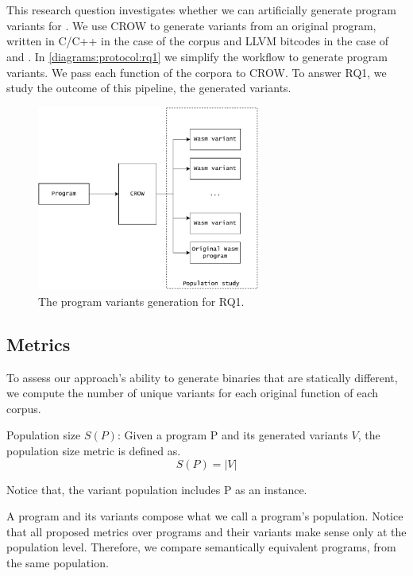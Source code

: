 
\section{\rqone}
\label{rq1:method}
This research question investigates whether we can artificially generate program variants for \wasm. We use CROW to generate variants from an original program, written in C/C++ in the case of the \corpusrosetta corpus and LLVM bitcodes in the case of \corpussodium and \corpusqrcode. 
In \autoref{diagrams:protocol:rq1} we simplify the workflow to generate \wasm program variants. We pass each function of the corpora to CROW. To answer RQ1, we study the outcome of this pipeline, the generated variants. 


\begin{figure}[h]
    \centering
    \includegraphics[height=2.4in]{diagrams/Rq1.pdf}
    \caption{The program variants generation for RQ1.}
    \label{diagrams:protocol:rq1}
\end{figure}


\subsection{Metrics}

To assess our approach's ability to generate \wasm binaries that are statically different, we compute the number of unique variants for each original function of each corpus. 

\begin{metric}{Population size $S(P)$:}\label{metric:md5sum}
    Given a program P and its generated variants $V$, the population size metric is defined as.\\
    $$
        S(P)=|V|
    $$

    Notice that, the variant population includes P as an instance.
\end{metric}

A program and its variants compose what we call a program's population. Notice that all proposed metrics over programs and their variants make sense only at the population level. Therefore, we compare semantically equivalent programs, from the same population.

